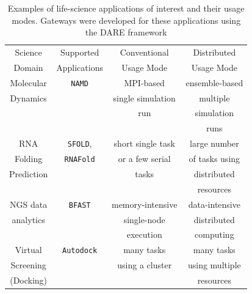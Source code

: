 \documentclass[]{svjour3}
\begin{document}
\begin{table}
\centering
 \small
\begin{tabular}{|c|c|c|c|} 
  \hline Science  & Supported  & Conventional   &   Distributed
  \\
  Domain & Applications & Usage Mode & Usage Mode\\ \hline \hline 
  
  Molecular   &  \texttt{NAMD} &  MPI-based  & ensemble-based   \\
  Dynamics  &  & single simulation  & multiple  \\ 
  &  & run &  simulation  \\ 
  &  &  &  runs \\ \hline
  RNA   & \texttt{SFOLD}, & short single task    & large number  \\
  Folding   & \texttt{RNAFold} & or a few serial & of tasks using   \\
  Prediction & &  tasks &distributed \\
  &  &  &   resources  \\ \hline
  NGS data     &  \texttt{BFAST} & memory-intensive  & data-intensive\\ 
  analytics  &  &  single-node   &  distributed  \\
  & & execution  & computing \\ \hline
  Virtual  & \texttt{Autodock} &  many tasks   & many tasks \\
  Screening  &  & using a cluster  & using multiple  \\
  (Docking) &  &  & resources \\ \hline
  \hline
\end{tabular} \caption{Examples of life-science applications of
  interest and their usage modes.  Gateways were developed for these
  applications using the DARE framework }
 \label{table:four-applications} 
\end{table}

\end{document}
